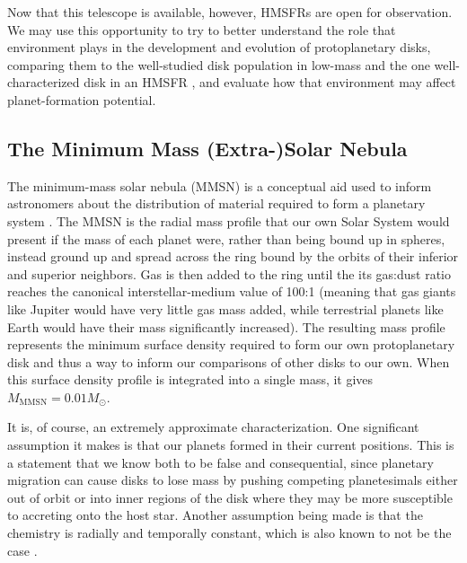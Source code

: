 Now that this telescope is available, however, HMSFRs are open for observation. We may use this opportunity to try to better understand the role that environment plays in the development and evolution of protoplanetary disks, comparing them to the well-studied disk population in low-mass \citep{AndrewsWilliams2005,Mann2015} and the one well-characterized disk in an HMSFR \citep{Factor2017}, and evaluate how that environment may affect planet-formation potential.



\subsection{The Minimum Mass (Extra-)Solar Nebula}

The minimum-mass solar nebula (MMSN) is a conceptual aid used to inform astronomers about the distribution of material required to form a planetary system \citep{Weidenschilling1977}. The MMSN is the radial mass profile that our own Solar System would present if the mass of each planet were, rather than being bound up in spheres, instead ground up and spread across the ring bound by the orbits of their inferior and superior neighbors. Gas is then added to the ring until the its gas:dust ratio reaches the canonical interstellar-medium value of 100:1 (meaning that gas giants like Jupiter would have very little gas mass added, while terrestrial planets like Earth would have their mass significantly increased). The resulting mass profile represents the minimum surface density required to form our own protoplanetary disk and thus a way to inform our comparisons of other disks to our own. When this surface density profile is integrated into a single mass, it gives $M_\text{MMSN} = 0.01 M_{\odot}$.

It is, of course, an extremely approximate characterization. One significant assumption it makes is that our planets formed in their current positions. This is a statement that we know both to be false \citep{Walsh2011,Tsiganis2005} and consequential, since planetary migration can cause disks to lose mass by pushing competing planetesimals either out of orbit or into inner regions of the disk where they may be more susceptible to accreting onto the host star. Another assumption being made is that the chemistry is radially and temporally constant, which is also known to not be the case \citep{vanDishoeckBlake1998}.

